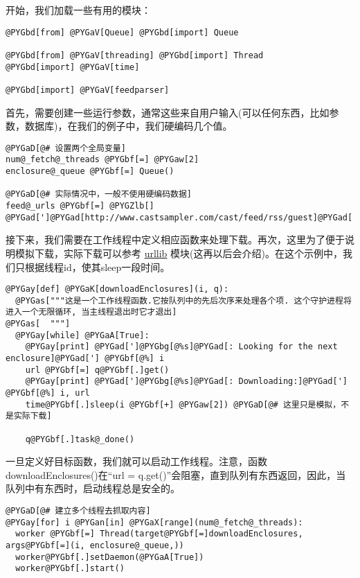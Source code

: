 \documentclass[letterpaper,10pt,english]{manual}
\begin{document}
开始，我们加载一些有用的模块：

\begin{Verbatim}[commandchars=@\[\]]
@PYGbd[from] @PYGaV[Queue] @PYGbd[import] Queue

@PYGbd[from] @PYGaV[threading] @PYGbd[import] Thread
@PYGbd[import] @PYGaV[time]

@PYGbd[import] @PYGaV[feedparser]
\end{Verbatim}

首先，需要创建一些运行参数，通常这些来自用户输入(可以任何东西，比如参数，数据库)，在我们的例子中，我们硬编码几个值。

\begin{Verbatim}[commandchars=@\[\]]
@PYGaD[@# 设置两个全局变量]
num@_fetch@_threads @PYGbf[=] @PYGaw[2]
enclosure@_queue @PYGbf[=] Queue()

@PYGaD[@# 实际情况中，一般不使用硬编码数据]
feed@_urls @PYGbf[=] @PYGZlb[] @PYGad[']@PYGad[http://www.castsampler.com/cast/feed/rss/guest]@PYGad['],@PYGZrb[]
\end{Verbatim}

接下来，我们需要在工作线程中定义相应函数来处理下载。再次，这里为了便于说明模拟下载，实际下载可以参考 \href{http://docs.python.org/lib/module-urllib.html}{urllib} 模块(这再以后会介绍)。在这个示例中，我们只根据线程id，使其sleep一段时间。

\begin{Verbatim}[commandchars=@\[\]]
@PYGay[def] @PYGaK[downloadEnclosures](i, q):
  @PYGas["""这是一个工作线程函数.它按队列中的先后次序来处理各个项. 这个守护进程将进入一个无限循环, 当主线程退出时它才退出]
@PYGas[  """]
  @PYGay[while] @PYGaA[True]:
    @PYGay[print] @PYGad[']@PYGbg[@%s]@PYGad[: Looking for the next enclosure]@PYGad['] @PYGbf[@%] i
    url @PYGbf[=] q@PYGbf[.]get()
    @PYGay[print] @PYGad[']@PYGbg[@%s]@PYGad[: Downloading:]@PYGad['] @PYGbf[@%] i, url
    time@PYGbf[.]sleep(i @PYGbf[+] @PYGaw[2]) @PYGaD[@# 这里只是模拟，不是实际下载]

    q@PYGbf[.]task@_done()
\end{Verbatim}

一旦定义好目标函数，我们就可以启动工作线程。注意，函数downloadEnclosures()在“url = q.get()”会阻塞，直到队列有东西返回，因此，当队列中有东西时，启动线程总是安全的。

\begin{Verbatim}[commandchars=@\[\]]
@PYGaD[@# 建立多个线程去抓取内容]
@PYGay[for] i @PYGan[in] @PYGaX[range](num@_fetch@_threads):
  worker @PYGbf[=] Thread(target@PYGbf[=]downloadEnclosures, args@PYGbf[=](i, enclosure@_queue,))
  worker@PYGbf[.]setDaemon(@PYGaA[True])
  worker@PYGbf[.]start()
\end{Verbatim}
\end{document}
